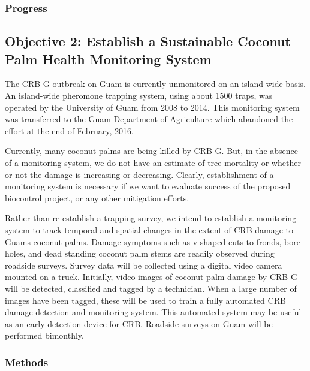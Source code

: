 \documentclass[12pt,letterpaper,english,bibliography=totocnumbered,abstract=on]{scrartcl}
\begin{document}
\subsubsection{Progress}

\newpage\begin{framed}
\section{Objective 2: Establish a Sustainable Coconut Palm Health Monitoring System}

The CRB-G outbreak on Guam is currently unmonitored on an island-wide basis. An island-wide pheromone trapping system, using about 1500 traps, was operated by the University of Guam from 2008 to 2014. This monitoring system was transferred to the Guam Department of Agriculture which abandoned the effort at the end of February, 2016.

Currently, many coconut palms are being killed by CRB-G. But, in the absence of a monitoring system, we do not have an estimate of tree mortality or whether or not the damage is increasing or decreasing. Clearly, establishment of a monitoring system is necessary if we want to evaluate success of the proposed biocontrol project, or any other mitigation efforts.

Rather than re-establish a trapping survey, we intend to establish a monitoring system to track temporal and spatial changes in the extent of CRB damage to Guams coconut palms. Damage symptoms such as v-shaped cuts to fronds, bore holes, and dead standing coconut palm stems are readily observed during roadside surveys. Survey data will be collected using a digital video camera mounted on a truck. Initially, video images of coconut palm damage by CRB-G will be detected, classified and tagged by a technician. When a large number of images have been tagged, these will be used to train a fully automated CRB damage detection and monitoring system. This automated system may be useful as an early detection device for CRB. Roadside surveys on Guam will be performed bimonthly.

\subsubsection{Methods}


\end{framed}
\end{document}
